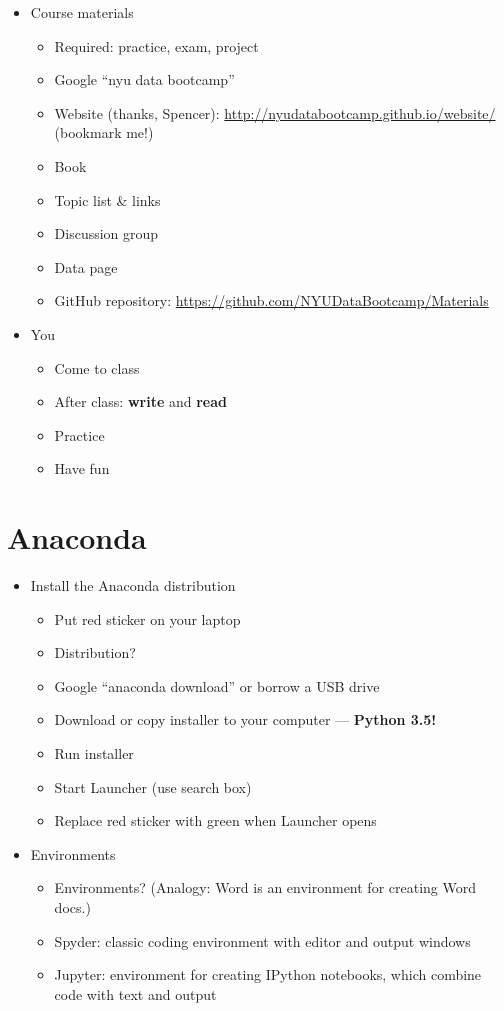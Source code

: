 \documentclass[11pt]{article}
\begin{document}
\begin{itemize}
\item Course materials
\begin{itemize}
\item Required:  practice, exam, project
\item Google ``nyu data bootcamp''
\item Website (thanks, Spencer):  \url{http://nyudatabootcamp.github.io/website/}  (bookmark me!)
\item Book
\item Topic list \& links
\item Discussion group
\item Data page
\item GitHub repository:  \url{https://github.com/NYUDataBootcamp/Materials}
\end{itemize}

\item You
\begin{itemize}
\item Come to class
\item After class:  {\bf write} and {\bf read}
\item Practice
\item Have fun
\end{itemize}
\end{itemize}


\section*{Anaconda}

\begin{itemize}
\item Install the Anaconda distribution
\begin{itemize}
\item Put red sticker on your laptop
\item Distribution?
\item Google ``anaconda download'' or borrow a USB drive
\item Download or copy installer to your computer --- {\bf Python 3.5!}
\item Run installer
\item Start Launcher (use search box)
\item Replace red sticker with green when Launcher opens
\end{itemize}

\item Environments
\begin{itemize}
\item Environments?  (Analogy:  Word is an environment for creating Word docs.)
\item Spyder:  classic coding environment with editor and output windows
\item Jupyter:  environment for creating IPython notebooks, which combine code with text and output
\end{itemize}

\end{itemize}
\end{document}
